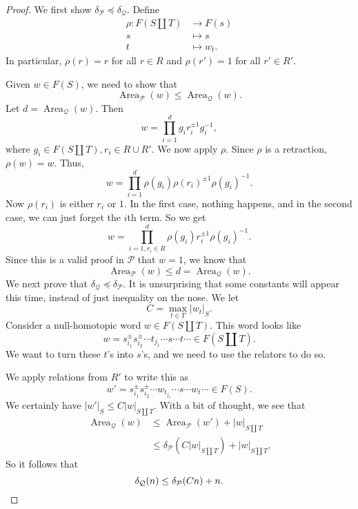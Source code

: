 \documentclass[a4paper]{article}
\DeclareMathOperator\Area{Area}
\begin{document}
\begin{proof}
  We first show $\delta_{\mathcal{P}} \preccurlyeq \delta_{\mathcal{Q}}$. Define
  \begin{align*}
    \rho: F(S \amalg T) & \to F(s)\\
    s &\mapsto s\\
    t &\mapsto w_t.
  \end{align*}
  In particular, $\rho(r) = r$ for all $r \in R$ and $\rho(r') = 1$ for all $r' \in R'$.

  Given $w \in F(S)$, we need to show that
  \[
    \Area_{\mathcal{P}}(w) \leq \Area_{\mathcal{Q}}(w).
  \]
  Let $d = \Area_\mathcal{Q} (w)$. Then
  \[
    w = \prod_{i = 1}^d g_i r_i^{\pm 1} g_i^{-1},
  \]
  where $g_i \in F(S \coprod T), r_i \in R \cup R'$. We now apply $\rho$. Since $\rho$ is a retraction, $\rho(w) = w$. Thus,
  \[
    w = \prod_{i = 1}^d \rho(g_i) \rho(r_i)^{\pm 1} \rho(g_i)^{-1}.
  \]
  Now $\rho(r_i)$ is either $r_i$ or $1$. In the first case, nothing happens, and in the second case, we can just forget the $i$th term. So we get
  \[
    w = \prod_{i = 1, r_i \in R}^d\rho(g_i) r_i^{\pm 1} \rho(g_i)^{-1}.
  \]
  Since this is a valid proof in $\mathcal{P}$ that $w = 1$, we know that
  \[
    \Area_{\mathcal{P}}(w) \leq d = \Area_{\mathcal{Q}}(w).
  \]
  We next prove that $\delta_{\mathcal{Q}} \preccurlyeq \delta_{\mathcal{P}}$. It is unsurprising that some constants will appear this time, instead of just inequality on the nose. We let
  \[
    C = \max_{t \in T} |w_t|_S.
  \]
  Consider a null-homotopic word $w \in F(S \amalg T)$. This word looks like
  \[
    w = s_{i_1}^{\pm} s_{i_2}^{\pm } \cdots t_{j_1} \cdots s \cdots t \cdots \in F(S \amalg T).
  \]
  We want to turn these $t$'s into $s$'s, and we need to use the relators to do so.

  We apply relations from $R'$ to write this as
  \[
    w' = s_{i_1}^{\pm} s_{i_2}^{\pm } \cdots w_{t_{j_1}} \cdots s \cdots w_t \cdots \in F(S).
  \]
  We certainly have $|w'|_S \leq C |w|_{S \amalg T}$. With a bit of thought, we see that
  \begin{align*}
    \Area_{\mathcal{Q}}(w) &\leq \Area_{\mathcal{P}}(w') + |w|_{S \amalg T}\\
    &\leq \delta_{\mathcal{P}}(C|w|_{S \amalg T} ) + |w|_{S \amalg T}.
  \end{align*}
  So it follows that
  \[
    \delta_{\mathcal{Q}}(n) \leq \delta_{\mathcal{P}}(Cn) + n.\qedhere
  \]
\end{proof}
\end{document}
